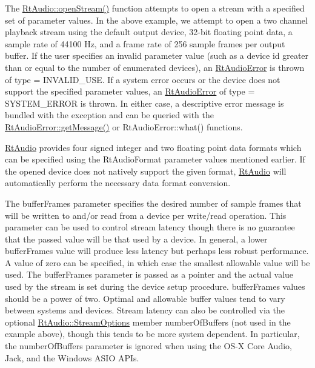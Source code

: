 The \mbox{\hyperlink{class_rt_audio_a6907539d2527775df778ebce32ef1e3b}{Rt\+Audio\+::open\+Stream()}} function attempts to open a stream with a specified set of parameter values. In the above example, we attempt to open a two channel playback stream using the default output device, 32-\/bit floating point data, a sample rate of 44100 Hz, and a frame rate of 256 sample frames per output buffer. If the user specifies an invalid parameter value (such as a device id greater than or equal to the number of enumerated devices), an \mbox{\hyperlink{class_rt_audio_error}{Rt\+Audio\+Error}} is thrown of type = I\+N\+V\+A\+L\+I\+D\+\_\+\+U\+SE. If a system error occurs or the device does not support the specified parameter values, an \mbox{\hyperlink{class_rt_audio_error}{Rt\+Audio\+Error}} of type = S\+Y\+S\+T\+E\+M\+\_\+\+E\+R\+R\+OR is thrown. In either case, a descriptive error message is bundled with the exception and can be queried with the \mbox{\hyperlink{class_rt_audio_error_a4dd8629dcb6a18052733135410183188}{Rt\+Audio\+Error\+::get\+Message()}} or Rt\+Audio\+Error\+::what() functions.

\mbox{\hyperlink{class_rt_audio}{Rt\+Audio}} provides four signed integer and two floating point data formats which can be specified using the Rt\+Audio\+Format parameter values mentioned earlier. If the opened device does not natively support the given format, \mbox{\hyperlink{class_rt_audio}{Rt\+Audio}} will automatically perform the necessary data format conversion.

The {\ttfamily buffer\+Frames} parameter specifies the desired number of sample frames that will be written to and/or read from a device per write/read operation. This parameter can be used to control stream latency though there is no guarantee that the passed value will be that used by a device. In general, a lower {\ttfamily buffer\+Frames} value will produce less latency but perhaps less robust performance. A value of zero can be specified, in which case the smallest allowable value will be used. The {\ttfamily buffer\+Frames} parameter is passed as a pointer and the actual value used by the stream is set during the device setup procedure. {\ttfamily buffer\+Frames} values should be a power of two. Optimal and allowable buffer values tend to vary between systems and devices. Stream latency can also be controlled via the optional \mbox{\hyperlink{struct_rt_audio_1_1_stream_options}{Rt\+Audio\+::\+Stream\+Options}} member {\ttfamily number\+Of\+Buffers} (not used in the example above), though this tends to be more system dependent. In particular, the {\ttfamily number\+Of\+Buffers} parameter is ignored when using the O\+S-\/X Core Audio, Jack, and the Windows A\+S\+IO A\+P\+Is.


